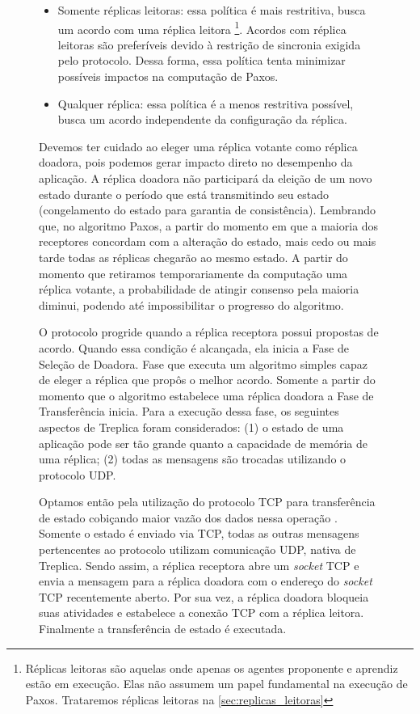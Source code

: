 \begin{figure}[ht]
\begin{itemize}
  \item Somente réplicas leitoras: essa política é mais restritiva, busca um acordo com
    uma réplica leitora \footnote{Réplicas leitoras são aquelas onde apenas os agentes
    proponente e aprendiz estão em execução. Elas não assumem um papel fundamental na
    execução de Paxos. Trataremos réplicas leitoras na \autoref{sec:replicas_leitoras}}.
    Acordos com réplica leitoras são preferíveis devido à restrição de sincronia exigida
    pelo protocolo. Dessa forma, essa política tenta minimizar possíveis impactos na
    computação de Paxos.
  \item Qualquer réplica: essa política é a menos restritiva possível, busca um acordo
    independente da configuração da réplica.
\end{itemize}

Devemos ter cuidado ao eleger uma réplica votante como réplica doadora, pois podemos gerar
impacto direto no desempenho da aplicação. A réplica doadora não participará da eleição de
um novo estado durante o período que está transmitindo seu estado (congelamento do estado
para garantia de consistência). Lembrando que, no algoritmo Paxos, a partir do momento em
que a maioria dos receptores concordam com a alteração do estado, mais cedo ou mais tarde
todas as réplicas chegarão ao mesmo estado. A partir do momento que retiramos
temporariamente da computação uma réplica votante, a probabilidade de atingir consenso
pela maioria diminui, podendo até impossibilitar o progresso do algoritmo.

O protocolo progride quando a réplica receptora possui propostas de acordo. Quando essa
condição é alcançada, ela inicia a Fase de Seleção de Doadora. Fase que executa um
algoritmo simples capaz de eleger a réplica que propôs o melhor acordo. Somente a partir
do momento que o algoritmo estabelece uma réplica doadora a Fase de Transferência inicia.
Para a execução dessa fase, os seguintes aspectos de Treplica foram considerados: (1) o
estado de uma aplicação pode ser tão grande quanto a capacidade de memória de uma réplica;
(2) todas as mensagens são trocadas utilizando o protocolo UDP.

Optamos então pela utilização do protocolo TCP para transferência de estado cobiçando
maior vazão dos dados nessa operação \cite{abdellatif04}. Somente o estado é enviado via
TCP, todas as outras mensagens pertencentes ao protocolo utilizam comunicação UDP, nativa
de Treplica. Sendo assim, a réplica receptora abre um \emph{socket} TCP e envia a mensagem
 para a réplica doadora com o endereço do \emph{socket} TCP
recentemente aberto. Por sua vez, a réplica doadora bloqueia suas atividades e estabelece
a conexão TCP com a réplica leitora. Finalmente a transferência de estado é executada.


\end{figure}
